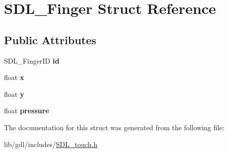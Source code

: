 \hypertarget{struct_s_d_l___finger}{}\section{S\+D\+L\+\_\+\+Finger Struct Reference}
\label{struct_s_d_l___finger}
\subsection*{Public Attributes}
\begin{DoxyCompactItemize}
\item 
\hypertarget{struct_s_d_l___finger_a3cec630146eeec5bd6299a9387a6f16a}{}S\+D\+L\+\_\+\+Finger\+I\+D {\bfseries id}\label{struct_s_d_l___finger_a3cec630146eeec5bd6299a9387a6f16a}

\item 
\hypertarget{struct_s_d_l___finger_ab91dfbd03c3215560457fef44e1c7755}{}float {\bfseries x}\label{struct_s_d_l___finger_ab91dfbd03c3215560457fef44e1c7755}

\item 
\hypertarget{struct_s_d_l___finger_a0a2c7a06ae641940111e03801c672cf9}{}float {\bfseries y}\label{struct_s_d_l___finger_a0a2c7a06ae641940111e03801c672cf9}

\item 
\hypertarget{struct_s_d_l___finger_a0ecb50c7fd699d59899ac60c941bdee6}{}float {\bfseries pressure}\label{struct_s_d_l___finger_a0ecb50c7fd699d59899ac60c941bdee6}

\end{DoxyCompactItemize}


The documentation for this struct was generated from the following file\+:\begin{DoxyCompactItemize}
\item 
lib/gdl/includes/\hyperlink{_s_d_l__touch_8h}{S\+D\+L\+\_\+touch.\+h}\end{DoxyCompactItemize}
